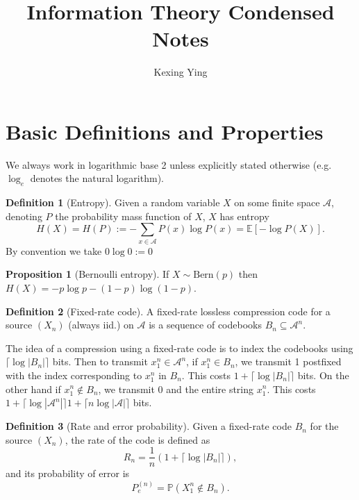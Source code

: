 \documentclass[]{article}
\title{Information Theory Condensed Notes}
\author{Kexing Ying}
\theoremstyle{definition}
\newtheorem*{definition}{Definition}
\newtheorem*{proposition}{Proposition}
\begin{document}
\maketitle

\section*{Basic Definitions and Properties}

We always work in logarithmic base 2 unless explicitly stated otherwise (e.g. \(\log_e\) denotes the natural logarithm).

\begin{definition}[Entropy]
  Given a random variable \(X\) on some finite space \(\mathscr{A}\), denoting \(P\) the probability mass function of \(X\), 
  \(X\) has entropy 
  \[H(X) = H(P) := - \sum_{x \in \mathscr{A}} P(x) \log P(x) = \mathbb{E}[-\log P(X)].\]
  By convention we take \(0\log 0 := 0\)
\end{definition}

\begin{proposition}[Bernoulli entropy]
  If \(X \sim \text{Bern}(p)\) then \(H(X) = -p\log p - (1 - p)\log (1 - p)\).
\end{proposition}


\begin{definition}[Fixed-rate code]
  A fixed-rate lossless compression code for a source \((X_n)\) (always iid.) on \(\mathscr{A}\) is a sequence 
  of codebooks \(B_n \subseteq \mathscr{A}^n\). 

  The idea of a compression using a fixed-rate code is to index the codebooks using \(\lceil\log |B_n|\rceil\) bits.
  Then to transmit \(x_1^n \in \mathscr{A}^n\), if \(x_1^n \in B_n\), we transmit 1 postfixed with the index 
  corresponding to \(x_1^n\) in \(B_n\). This costs \(1 + \lceil \log|B_n|\rceil\) bits. On the other 
  hand if \(x_1^n \not\in B_n\), we transmit 0 and the entire string \(x_1^n\). This costs 
  \(1 + \lceil \log|\mathscr{A}^n|\rceil 1 + \lceil n\log|\mathscr{A}|\rceil\) bits.
\end{definition}

\begin{definition}[Rate and error probability]
  Given a fixed-rate code \(B_n\) for the source \((X_n)\), the rate of the code is defined as 
  \[R_n = \frac{1}{n}(1 + \lceil\log|B_n|\rceil),\]
  and its probability of error is 
  \[P_e^{(n)} = \mathbb{P}(X_1^n \not\in B_n).\]
\end{definition}
\end{document}
